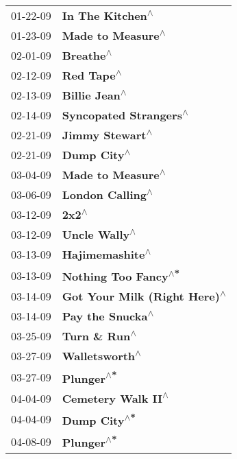 \begin{supertabular}{p{0.25\columnwidth}p{0.75\columnwidth}}
 01-22-09 &              \textbf{In The Kitchen\textsuperscript{$\wedge$}} \\
 01-23-09 &             \textbf{Made to Measure\textsuperscript{$\wedge$}} \\
 02-01-09 &                     \textbf{Breathe\textsuperscript{$\wedge$}} \\
 02-12-09 &                    \textbf{Red Tape\textsuperscript{$\wedge$}} \\
 02-13-09 &                 \textbf{Billie Jean\textsuperscript{$\wedge$}} \\
 02-14-09 &        \textbf{Syncopated Strangers\textsuperscript{$\wedge$}} \\
 02-21-09 &               \textbf{Jimmy Stewart\textsuperscript{$\wedge$}} \\
 02-21-09 &                   \textbf{Dump City\textsuperscript{$\wedge$}} \\
 03-04-09 &             \textbf{Made to Measure\textsuperscript{$\wedge$}} \\
 03-06-09 &              \textbf{London Calling\textsuperscript{$\wedge$}} \\
 03-12-09 &                         \textbf{2x2\textsuperscript{$\wedge$}} \\
 03-12-09 &                 \textbf{Uncle Wally\textsuperscript{$\wedge$}} \\
 03-13-09 &               \textbf{Hajimemashite\textsuperscript{$\wedge$}} \\
 03-13-09 &          \textbf{Nothing Too Fancy\textsuperscript{$\wedge$*}} \\
 03-14-09 &  \textbf{Got Your Milk (Right Here)\textsuperscript{$\wedge$}} \\
 03-14-09 &              \textbf{Pay the Snucka\textsuperscript{$\wedge$}} \\
 03-25-09 &                 \textbf{Turn \& Run\textsuperscript{$\wedge$}} \\
 03-27-09 &                \textbf{Walletsworth\textsuperscript{$\wedge$}} \\
 03-27-09 &                    \textbf{Plunger\textsuperscript{$\wedge$*}} \\
 04-04-09 &            \textbf{Cemetery Walk II\textsuperscript{$\wedge$}} \\
 04-04-09 &                  \textbf{Dump City\textsuperscript{$\wedge$*}} \\
 04-08-09 &                    \textbf{Plunger\textsuperscript{$\wedge$*}} \\

\end{supertabular}
